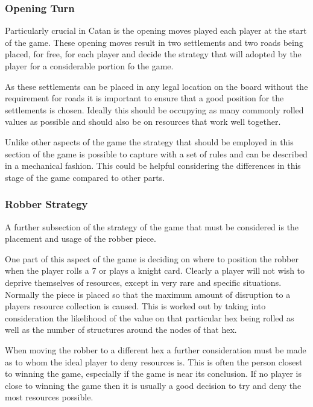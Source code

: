 \documentclass[]{article}
\begin{document}
\subsubsection{Opening Turn}
Particularly crucial in Catan is the opening moves played each player at the start of the game. These opening moves result in two settlements and two roads being placed, for free, for each player and decide the strategy that will adopted by the player for a considerable portion fo the game. 

\par As these settlements can be placed in any legal location on the board without the requirement for roads it is important to ensure that a good position for the settlements is chosen. Ideally this should be occupying as many commonly rolled values as possible and should also be on resources that work well together.

\par Unlike other aspects of the game the strategy that should be employed in this section of the game is possible to capture with a set of rules and can be described in a mechanical fashion. This could be helpful considering the differences in this stage of the game compared to other parts.

\subsubsection{Robber Strategy}
A further subsection of the strategy of the game that must be considered is the placement and usage of the robber piece. 

\par One part of this aspect of the game is deciding on where to position the robber when the player rolls a 7 or plays a knight card. Clearly a player will not wish to deprive themselves of resources, except in very rare and specific situations. Normally the piece is placed so that the maximum amount of disruption to a players resource collection is caused. This is worked out by taking into consideration the likelihood of the value on that particular hex being rolled as well as the number of structures around the nodes of that hex.

\par When moving the robber to a different hex a further consideration must be made as to whom the ideal player to deny resources is. This is often the person closest to winning the game, especially if the game is near its conclusion. If no player is close to winning the game then it is usually a good decision to try and deny the most resources possible.
\end{document}
